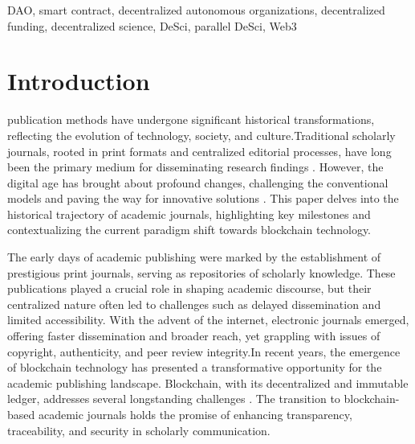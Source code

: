 \documentclass[lettersize,journal]{IEEEtran}
\begin{document}
\begin{IEEEkeywords}
DAO, smart contract, decentralized autonomous organizations, decentralized funding, decentralized science, DeSci, parallel DeSci, Web3
\end{IEEEkeywords}

\section{Introduction}

 publication methods have undergone significant historical transformations, reflecting the evolution of technology, society, and culture.Traditional scholarly journals, rooted in print formats and centralized editorial processes, have long been the primary medium for disseminating research findings \cite{febvre1997coming}. However, the digital age has brought about profound changes, challenging the conventional models and paving the way for innovative solutions \cite{meadows1997communicating}. This paper delves into the historical trajectory of academic journals, highlighting key milestones and contextualizing the current paradigm shift towards blockchain technology.

The early days of academic publishing were marked by the establishment of prestigious print journals, serving as repositories of scholarly knowledge. These publications played a crucial role in shaping academic discourse, but their centralized nature often led to challenges such as delayed dissemination and limited accessibility. With the advent of the internet, electronic journals emerged, offering faster dissemination and broader reach, yet grappling with issues of copyright, authenticity, and peer review integrity.In recent years, the emergence of blockchain technology has presented a transformative opportunity for the academic publishing landscape. Blockchain, with its decentralized and immutable ledger, addresses several longstanding challenges \cite{swan2015blockchain}. The transition to blockchain-based academic journals holds the promise of enhancing transparency, traceability, and security in scholarly communication.
\end{document}
